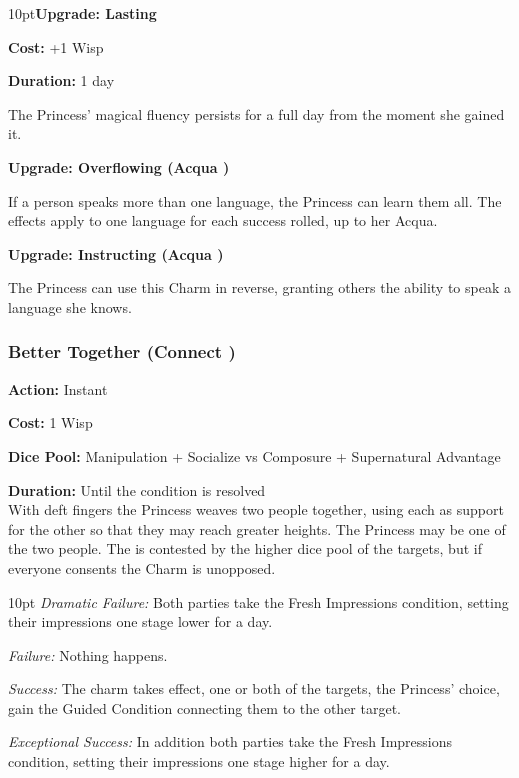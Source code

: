 \begin{myindentpar}{10pt}\textbf{Upgrade: Lasting}

\noindent \textbf{Cost:} +1 Wisp

\noindent \textbf{Duration:} 1 day

The Princess' magical fluency persists for a full day from the moment she gained it.

\textbf{Upgrade: Overflowing (Acqua \textbullet\textbullet)}

If a person speaks more than one language, the Princess can learn them all. The effects apply to one language for each success rolled, up to her Acqua.

\textbf{Upgrade: Instructing (Acqua \textbullet\textbullet)}

The Princess can use this Charm in reverse, granting others the ability to speak a language she knows. 

\end{myindentpar}

\subsubsection*{Better Together (Connect \textbullet\textbullet)}

\noindent \textbf{Action:} Instant

\noindent \textbf{Cost:} 1 Wisp

\noindent \textbf{Dice Pool:} Manipulation + Socialize vs Composure + Supernatural Advantage

\noindent \textbf{Duration:} Until the condition is resolved \\

\noindent With deft fingers the Princess weaves two people together, using each as support for the other so that they may reach greater heights. The Princess may be one of the two people. The is contested by the higher dice pool of the targets, but if everyone consents the Charm is unopposed. 

\begin{myindentpar}{10pt}
    \emph{Dramatic Failure:} Both parties take the Fresh Impressions condition, setting their impressions one stage lower for a day. 
    
    \emph{Failure:} Nothing happens. 
    
    \emph{Success:} The charm takes effect, one or both of the targets, the Princess' choice, gain the Guided Condition connecting them to the other target.
    
    \emph{Exceptional Success:} In addition both parties take the Fresh Impressions condition, setting their impressions one stage higher for a day. 
\end{myindentpar}

